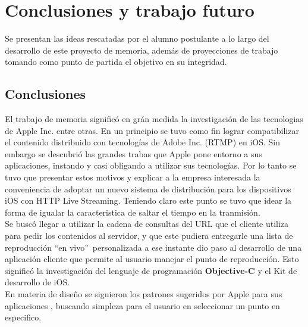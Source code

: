 
\chapter{Conclusiones y trabajo futuro}
Se presentan las ideas rescatadas por el alumno postulante a lo largo del desarrollo de este proyecto de memoria, además de proyecciones de trabajo tomando como punto de partida el objetivo en su integridad.


\section{Conclusiones}

El trabajo de memoria significó en grán medida la investigación de las tecnologias de Apple Inc. entre otras. En un principio se tuvo como fin lograr compatibilizar el contenido distribuido con tecnologías de Adobe Inc. (RTMP) en iOS. 
Sin embargo se descubrió las grandes trabas que Apple pone entorno a sus aplicaciones, instando y casi obligando a utilizar sus tecnologías. 
Por lo tanto se tuvo que presentar estos motivos y explicar a la empresa interesada la conveniencia de adoptar un nuevo sistema de distribución para los dispositivos iOS con HTTP Live Streaming. Teniendo claro este punto se tuvo que idear la forma de igualar la caracteristica de saltar el tiempo en la tranmisión. \\ 

Se buscó llegar a utilizar la cadena de consultas del URL que el cliente utiliza para pedir los contenidos al servidor, y que este pudiera entregarle una lista de reproducción \textquotedblleft en vivo\textquotedblright \ personalizada a ese instante dio paso al desarrollo de una aplicación cliente que permite al usuario manejar el punto de reproducción. Esto significó la investigación del lenguaje de programación \textbf{Objective-C} y el Kit de desarrollo de iOS.\\

En materia de diseño se siguieron los patrones sugeridos por Apple para sus aplicaciones \cite{apple-interface-user-control}, buscando simpleza para el usuario en seleccionar un punto en especifico.\\


